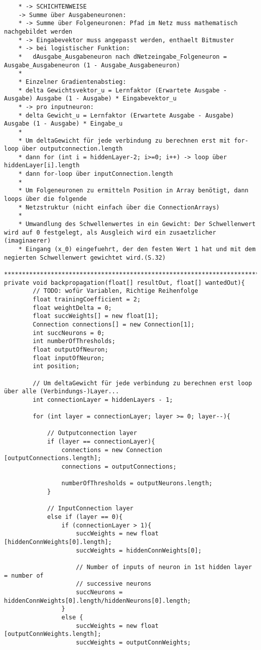 \begin{lstlisting}
	* -> SCHICHTENWEISE
	-> Summe über Ausgabeneuronen:
	* -> Summe über Folgeneuronen: Pfad im Netz muss mathematisch nachgebildet werden
	* -> Eingabevektor muss angepasst werden, enthaelt Bitmuster
	* -> bei logistischer Funktion:
	*	dAusgabe_Ausgabeneuron nach dNetzeingabe_Folgeneuron = Ausgabe_Ausgabeneuron (1 - Ausgabe_Ausgabeneuron)
	*
	* Einzelner Gradientenabstieg:
	* delta Gewichtsvektor_u = Lernfaktor (Erwartete Ausgabe - Ausgabe) Ausgabe (1 - Ausgabe) * Eingabevektor_u
	* -> pro inputneuron:
	* delta Gewicht_u = Lernfaktor (Erwartete Ausgabe - Ausgabe) Ausgabe (1 - Ausgabe) * Eingabe_u
	*
	* Um deltaGewicht für jede verbindung zu berechnen erst mit for-loop über outputconnection.length
	* dann for (int i = hiddenLayer-2; i>=0; i++) -> loop über hiddenLayer[i].length
	* dann for-loop über inputConnection.length
	*
	* Um Folgeneuronen zu ermitteln Position in Array benötigt, dann loops über die folgende
	* Netzstruktur (nicht einfach über die ConnectionArrays)
	*
	* Umwandlung des Schwellenwertes in ein Gewicht: Der Schwellenwert wird auf 0 festgelegt, als Ausgleich wird ein zusaetzlicher (imaginaerer)
	* Eingang (x_0) eingefuehrt, der den festen Wert 1 hat und mit dem negierten Schwellenwert gewichtet wird.(S.32)
	****************************************************************************************/
private	void backpropagation(float[] resultOut, float[] wantedOut){
		// TODO: wofür Variablen, Richtige Reihenfolge
		float trainingCoefficient = 2;
		float weightDelta = 0;
		float succWeights[] = new float[1];
		Connection connections[] = new Connection[1];
		int succNeurons = 0;
		int numberOfThresholds;
		float outputOfNeuron;
		float inputOfNeuron;
		int position;
		
		// Um deltaGewicht für jede verbindung zu berechnen erst loop über alle (Verbindungs-)Layer...
		int connectionLayer = hiddenLayers - 1;
		
		for (int layer = connectionLayer; layer >= 0; layer--){
			
			// Outputconnection layer
			if (layer == connectionLayer){
				connections = new Connection [outputConnections.length];
				connections = outputConnections;
				
				numberOfThresholds = outputNeurons.length;
			}
			
			// InputConnection layer
			else if (layer == 0){
				if (connectionLayer > 1){
					succWeights = new float [hiddenConnWeights[0].length];
					succWeights = hiddenConnWeights[0];
					
					// Number of inputs of neuron in 1st hidden layer = number of
					// successive neurons
					succNeurons = hiddenConnWeights[0].length/hiddenNeurons[0].length;
				}
				else {
					succWeights = new float [outputConnWeights.length];
					succWeights = outputConnWeights;
					

\end{lstlisting}
